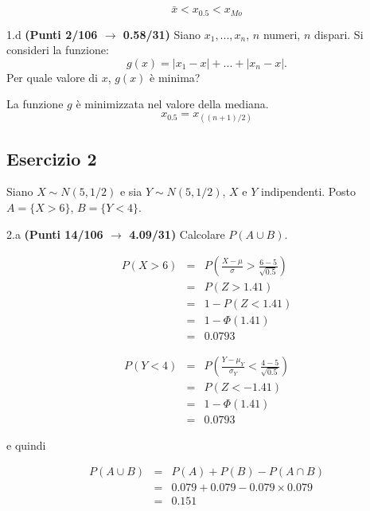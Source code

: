 \documentclass[
  11pt,
]{book}
\theoremstyle{mytheoremstyle}
\theoremstyle{mydefstyle}
\newenvironment{sol}
  {
  \begin{tcolorbox}[enhanced,breakable,arc=0.1mm,boxrule=1pt,colback=white,colframe=iblue,
  title=\bf \fontfamily{lmss}\selectfont \hspace{.5 cm} Soluzione,drop fuzzy shadow]

}{
\end{tcolorbox}
  }
\begin{document}
\begin{sol}
\[\bar x<x_{0.5}<x_{Mo}\]

\end{sol}

1.d \textbf{(Punti 2/106 \(\rightarrow\) 0.58/31)} Siano \(x_1,...,x_n\), \(n\) numeri, \(n\) dispari.
Si consideri la funzione:
\[g(x)=|x_1-x|+...+|x_n-x|.\]
Per quale valore di \(x\), \(g(x)\) è minima?

\begin{sol}
La funzione \(g\) è minimizzata nel valore della mediana.
\[x_{0.5}=x_{((n+1)/2)}\]

\end{sol}

\subsection{Esercizio 2}\label{esercizio-2-16}

Siano \(X\sim N(5,1/2)\) e sia \(Y\sim N(5,1/2)\), \(X\) e \(Y\) indipendenti. Posto \(A=\{X>6\}\), \(B=\{Y<4\}\).

2.a \textbf{(Punti 14/106 \(\rightarrow\) 4.09/31)} Calcolare \(P(A\cup B)\).

\begin{sol}
\begin{eqnarray*}
      P( X   >   6 ) 
        &=& P\left(  \frac { X  -  \mu }{ \sigma }  >  \frac { 6  -  5 }{\sqrt{ 0.5 }} \right)  \\
                 &=& P\left(  Z   >   1.41 \right) \\    &=& 1-P(Z< 1.41 )\\ 
                 &=&  1-\Phi( 1.41 ) \\ &=&  0.0793 
      \end{eqnarray*}

\begin{eqnarray*}
      P( Y   <   4 ) 
        &=& P\left(  \frac { Y  -  \mu_Y }{ \sigma_Y }  <  \frac { 4  -  5 }{\sqrt{ 0.5 }} \right)  \\
                 &=& P\left(  Z   <   -1.41 \right) \\    
                 &=&  1-\Phi( 1.41 ) \\ &=&  0.0793 
      \end{eqnarray*}

e quindi

\begin{eqnarray*}
  P(A\cup B) &=&  P(A)+P(B)-P(A\cap B)\\
  &=& 0.079+0.079-0.079\times0.079\\
  &=& 0.151 
\end{eqnarray*}

\end{sol}
\end{document}
